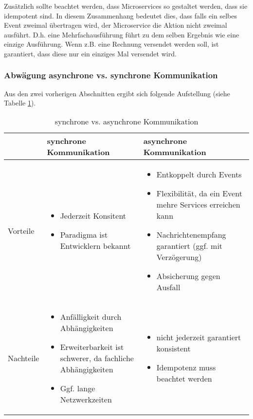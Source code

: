 Zusätzlich sollte beachtet werden, dass Microservices so gestaltet werden, dass sie idempotent sind. In diesem Zusammenhang bedeutet dies, dass falls ein selbes Event zweimal übertragen wird, der Microservice die Aktion nicht zweimal ausführt. D.h. eine Mehrfachausführung führt zu dem selben Ergebnis wie eine einzige Ausführung. Wenn z.B. eine Rechnung versendet werden soll, ist garantiert, dass diese nur ein einziges Mal versendet wird.\cite{wolff2018mic_praxis} \\

\subsubsection{Abwägung asynchrone vs. synchrone Kommunikation}

Aus den zwei vorherigen Abschnitten ergibt sich folgende Aufstellung (siehe Tabelle \ref{tab:sync_vs_async_table}).

\begin{table}[H]
	\begin{center}
		\begin{tabular}{p{}p{5cm}p{5cm}}
			& synchrone Kommunikation & asynchrone Kommunikation \\ \hline
			 Vorteile
			&
				\begin{itemize}
					\item Jederzeit Konsitent
					\item Paradigma ist Entwicklern bekannt\cite{wolff2018mic_praxis}
				\end{itemize} 
			& 
				\begin{itemize}
					\item Entkoppelt durch Events 
					\item Flexibilität, da ein Event mehre Services erreichen kann
					\item Nachrichtenempfang garantiert (ggf. mit Verzögerung)
					\item Absicherung gegen Ausfall
				\end{itemize} 
  			\\
			Nachteile
		  &
 			  	\begin{itemize}
				 	\item Anfälligkeit durch Abhängigkeiten 
				 	\item Erweiterbarkeit ist schwerer, da fachliche Abhängigkeiten
				 	\item Ggf. lange Netzwerkzeiten
				 \end{itemize}
		  & 
		 	\begin{itemize}
		 		\item nicht jederzeit garantiert konsistent
		 		\item Idempotenz muss beachtet werden
	 		\end{itemize}  \\
		\end{tabular}
	\end{center}
	\caption[synchrone vs. asynchrone Kommunikation]{synchrone vs. asynchrone Kommunikation}
	\label{tab:sync_vs_async_table} 
\end{table}

